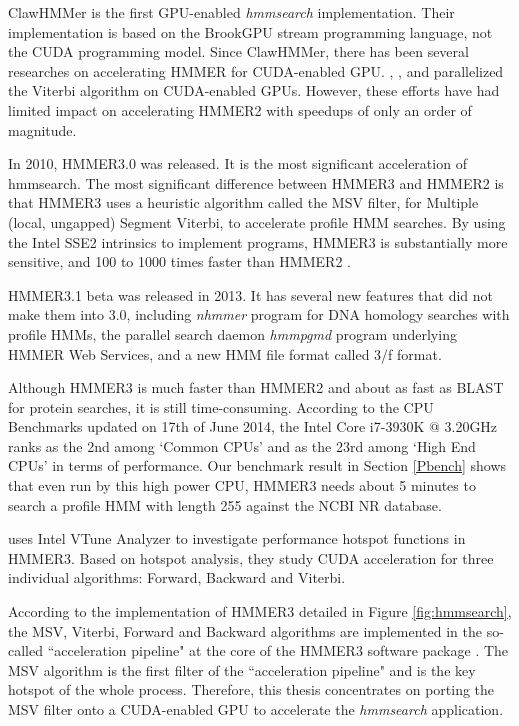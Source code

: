 ClawHMMer \citep{ClawHMMER} is the first GPU-enabled \emph{hmmsearch} implementation. Their implementation is based on the BrookGPU stream programming language, not the CUDA programming model. Since ClawHMMer, there has been several researches on accelerating HMMER for CUDA-enabled GPU. 
\citep{GPUHMM}, \citep{Ganesan}, \citep{Du} and \citep{Quirem} parallelized the Viterbi algorithm on CUDA-enabled GPUs.
However, these efforts have had limited impact on accelerating HMMER2 with speedups of only an order of magnitude.

In 2010, HMMER3.0 was released. It is the most significant acceleration of hmmsearch. The most significant difference between HMMER3 and HMMER2 is that HMMER3 uses a heuristic algorithm called the MSV filter, for Multiple (local, ungapped) Segment Viterbi, to accelerate profile HMM searches. By using the Intel SSE2 intrinsics to implement programs, HMMER3 is substantially more sensitive, and 100 to 1000 times faster than HMMER2 \citep{HMMER3}.

HMMER3.1 beta was released in 2013. It has several new features that did not make them into 3.0, including \emph{nhmmer} program for DNA homology searches with profile HMMs, the parallel search daemon \emph{hmmpgmd} program underlying HMMER Web Services, and a new HMM file format called 3/f format.

Although HMMER3 is much faster than HMMER2 and about as fast as BLAST for protein searches, it is still time-consuming. According to the CPU Benchmarks \citep{cpus} updated on 17th of June 2014, the Intel Core i7-3930K @ 3.20GHz ranks as the 2nd among `Common CPUs' and as the 23rd among `High End CPUs' in terms of performance. Our benchmark result in Section \ref{Pbench} shows that even run by this high power CPU, HMMER3 needs about 5 minutes to search a profile HMM with length 255 against the NCBI NR database.

\citep{Ahmed} uses Intel VTune Analyzer \citep{Intel} to investigate performance hotspot functions in HMMER3. Based on hotspot analysis, they study CUDA acceleration for three individual algorithms: Forward, Backward and Viterbi.

According to the implementation of HMMER3 detailed in Figure \ref{fig:hmmsearch}, the MSV, Viterbi, Forward and Backward algorithms are implemented in the so-called ``acceleration pipeline" at the core of the HMMER3 software package \citep{HMMER3}. The MSV algorithm is the first filter of the ``acceleration pipeline" and is the key hotspot of the whole process. Therefore, this thesis concentrates on porting the MSV filter onto a CUDA-enabled GPU to accelerate the \emph{hmmsearch} application.

